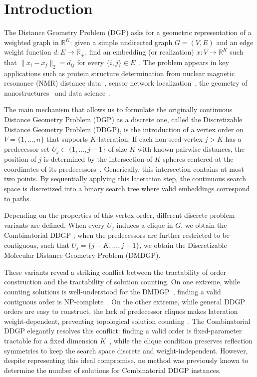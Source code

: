 \section{Introduction}
\label{sec:intro}

The Distance Geometry Problem (DGP) asks for a geometric representation of a weighted graph in $\mathbb{R}^K$: given a simple undirected graph $G = (V, E)$ and an edge weight function $d: E \to \mathbb{R}_+$, find an embedding (or realization) $x: V \to \mathbb{R}^K$ such that $\|x_i - x_j\|_2 = d_{ij}$ for every $\{i,j\}\in E$~\cite{mucherino2012discretizable}. The problem appears in key applications such as protein structure determination from nuclear magnetic resonance (NMR) distance data~\cite{liberti2008branch}, sensor network localization~\cite{yemini1978positioning}, the geometry of nanostructures~\cite{mucherino2020analysis} and data science~\cite{liberti2020distance}.

The main mechanism that allows us to formulate the originally continuous Distance Geometry Problem (DGP) as a discrete one, called the Discretizable Distance Geometry Problem (DDGP), is the introduction of a vertex order on $V = \{1, \ldots, n\}$ that supports $K$-lateration. If each non-seed vertex $j > K$ has a predecessor set $U_j \subset \{1, \ldots, j-1\}$ of size $K$ with known pairwise distances, the position of $j$ is determined by the intersection of $K$ spheres centered at the coordinates of its predecessors~\cite{mucherino2012discretizable,liberti2014number}. Generically, this intersection contains at most two points. By sequentially applying this lateration step, the continuous search space is discretized into a binary search tree where valid embeddings correspond to paths. 

Depending on the properties of this vertex order, different discrete problem variants are defined. When every $U_j$ induces a clique in $G$, we obtain the Combinatorial DDGP \cite{abud2024impossible}; when the predecessors are further restricted to be contiguous, such that $U_j=\{j-K, \ldots, j-1\}$, we obtain the Discretizable Molecular Distance Geometry Problem (DMDGP).

These variants reveal a striking conflict between the tractability of order construction and the tractability of solution counting. On one extreme, while counting solutions is well-understood for the DMDGP~\cite{liberti2013counting}, finding a valid contiguous order is NP-complete~\cite{cassioli2015discretization}. On the other extreme, while general DDGP orders are easy to construct, the lack of predecessor cliques makes lateration weight-dependent, preventing topological solution counting~\cite{abud2024impossible}. The Combinatorial DDGP elegantly resolves this conflict: finding a valid order is fixed-parameter tractable for a fixed dimension $K$~\cite{cassioli2015discretization}, while the clique condition preserves reflection symmetries to keep the search space discrete and weight-independent. However, despite representing this ideal compromise, no method was previously known to determine the number of solutions for Combinatorial DDGP instances.


